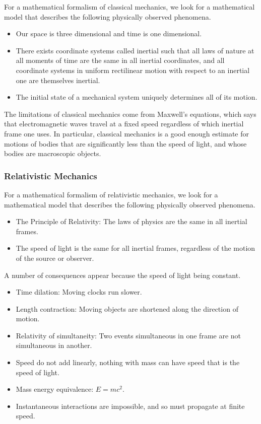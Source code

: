 \documentclass[a4paper]{article}
\begin{document}
For a mathematical formalism of classical mechanics, we look for a mathematical model that describes the following physically observed phenomena. 
\begin{itemize}
\item Our space is three dimensional and time is one dimensional. 
\item There exists coordinate systems called inertial such that all laws of nature at all moments of time are the same in all inertial coordinates, and all coordinate systems in uniform rectilinear motion with respect to an inertial one are themselves inertial. 
\item The initial state of a mechanical system uniquely determines all of its motion. 
\end{itemize}

The limitations of classical mechanics come from Maxwell's equations, which says that electromagnetic waves travel at a fixed speed regardless of which inertial frame one uses. In particular, classical mechanics is a good enough estimate for motions of bodies that are significantly less than the speed of light, and whose bodies are macroscopic objects. 

\subsubsection*{Relativistic Mechanics}
For a mathematical formalism of relativistic mechanics, we look for a mathematical model that describes the following physically observed phenomena. 
\begin{itemize}
\item The Principle of Relativity: The laws of physics are the same in all inertial frames. 
\item The speed of light is the same for all inertial frames, regardless of the motion of the source or observer. 
\end{itemize}
A number of consequences appear because the speed of light being constant. 
\begin{itemize}
\item Time dilation: Moving clocks run slower. 
\item Length contraction: Moving objects are shortened along the direction of motion. 
\item Relativity of simultaneity: Two events simultaneous in one frame are not simultaneous in another. 
\item Speed do not add linearly, nothing with mass can have speed that is the speed of light. 
\item Mass energy equivalence: $E=mc^2$. 
\item Instantaneous interactions are impossible, and so must propagate at finite speed. 
\end{itemize}
\end{document}
